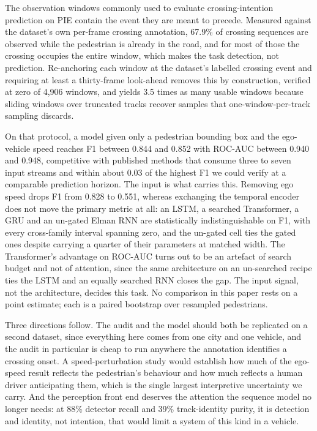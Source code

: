 \documentclass[mti,article,submit,moreauthors]{Definitions/mdpi}
\begin{document}
The observation windows commonly used to evaluate crossing-intention prediction on PIE contain the event they are meant to precede. Measured against the dataset's own per-frame crossing annotation, 67.9\% of crossing sequences are observed while the pedestrian is already in the road, and for most of those the crossing occupies the entire window, which makes the task detection, not prediction. Re-anchoring each window at the dataset's labelled crossing event and requiring at least a thirty-frame look-ahead removes this by construction, verified at zero of 4,906 windows, and yields 3.5 times as many usable windows because sliding windows over truncated tracks recover samples that one-window-per-track sampling discards.

On that protocol, a model given only a pedestrian bounding box and the ego-vehicle speed reaches F1 between 0.844 and 0.852 with ROC-AUC between 0.940 and 0.948, competitive with published methods that consume three to seven input streams and within about 0.03 of the highest F1 we could verify at a comparable prediction horizon. The input is what carries this. Removing ego speed drops F1 from 0.828 to 0.551, whereas exchanging the temporal encoder does not move the primary metric at all: an LSTM, a searched Transformer, a GRU and an un-gated Elman RNN are statistically indistinguishable on F1, with every cross-family interval spanning zero, and the un-gated cell ties the gated ones despite carrying a quarter of their parameters at matched width. The Transformer's advantage on ROC-AUC turns out to be an artefact of search budget and not of attention, since the same architecture on an un-searched recipe ties the LSTM and an equally searched RNN closes the gap. The input signal, not the architecture, decides this task. No comparison in this paper rests on a point estimate; each is a paired bootstrap over resampled pedestrians.

Three directions follow. The audit and the model should both be replicated on a second dataset, since everything here comes from one city and one vehicle, and the audit in particular is cheap to run anywhere the annotation identifies a crossing onset. A speed-perturbation study would establish how much of the ego-speed result reflects the pedestrian's behaviour and how much reflects a human driver anticipating them, which is the single largest interpretive uncertainty we carry. And the perception front end deserves the attention the sequence model no longer needs: at 88\% detector recall and 39\% track-identity purity, it is detection and identity, not intention, that would limit a system of this kind in a vehicle.
\end{document}
